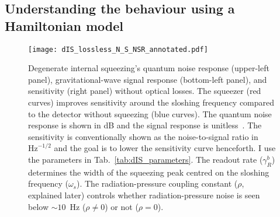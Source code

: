 \begin{comment}
	Inspecting $\text{T}\begin{bsmallmatrix}1 \\1\end{bsmallmatrix}$, i.e.\ the vector of signal transfer functions to each quadrature, shows that there are two terms: (1) rotates between the quadratures with the pump phase and (2) stays in the second quadrature and never vanishes with the pump phase\jam{(is it worth showing this?)}. I consider measuring the second quadrature at the photodetector since the signal is always there~\footnote{This does not mean that it is necessarily optimal to do so since the profile of the noise between the two quadratures is different to the signal, but it will suffice here~\cite{}.\jam{(What happens if I use $\phi=\pi$ and observe the first quadrature instead?)}}, and therefore the sensitivity ($\sqrt{S_h}$ is the noise-to-signal ratio) is
	\begin{equation}
	S_h = \frac{(\text{S}_X)_{2,2}}{\abs{(\text{T}\begin{bsmallmatrix}1 \\1\end{bsmallmatrix})_2}^2}.
	\end{equation}
\end{comment}


\subsection{Understanding the behaviour using a Hamiltonian model}
\label{sec:dIS_results}

\begin{figure}
	\centering
	\texttt{[image: dIS\_lossless\_N\_S\_NSR\_annotated.pdf]}
	\caption{ Degenerate internal squeezing's quantum noise response (upper-left panel), gravitational-wave signal response (bottom-left panel), and sensitivity (right panel) without optical losses. The squeezer (red curves) improves sensitivity around the sloshing frequency compared to the detector without squeezing (blue curves). The quantum noise response is shown in dB and the signal response is unitless~\cite{danilishinQuantumMeasurementTheory2012}. The sensitivity is conventionally shown as the noise-to-signal ratio in $\text{Hz}^{-1/2}$ and the goal is to lower the sensitivity curve henceforth. I use the parameters in Tab.~\ref{tab:dIS_parameters}. The readout rate ($\gamma^b_R$) determines the width of the squeezing peak centred on the sloshing frequency ($\omega_s$). %
	The radiation-pressure coupling constant ($\rho$, explained later) controls whether radiation-pressure noise is seen below $\sim10$~Hz ($\rho\neq0$) or not ($\rho=0$).
	}
	\label{fig:dIS_sensitivity}
\end{figure}


